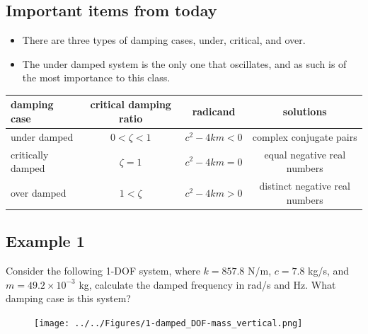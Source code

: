 \documentclass[12pt,a4paper]{article}
\begin{document}
		\subsection*{Important items from today}
	
			\begin{itemize}
				\item There are three types of damping cases, under, critical, and over. 
				\item The under damped system is the only one that oscillates, and as such is of the most importance to this class. 
			\end{itemize}

			\begin{table}[h!]
				\centering
				\begin{tabular}{lccc}
					\toprule
					damping case & critical damping ratio & radicand & solutions  \\ \midrule
					under damped &  $0<\zeta<1$ & $c^2-4km<0$ & complex conjugate pairs \\
					critically damped & $\zeta=1$ & $c^2-4km=0$ & equal negative real numbers \\
					over damped & $1<\zeta$  & $c^2-4km>0$ & distinct negative real numbers \\ \bottomrule
				\end{tabular}
			\end{table}
			
			\subsection*{Example 1}	Consider the following 1-DOF system, where $k = 857.8$ N/m, $c=7.8$ kg/s, and $m=49.2\times10^{-3}$ kg, calculate the damped frequency in rad/s and Hz. What damping case is this system?  	
			\begin{figure}[H]
				\centering
				\texttt{[image: ../../Figures/1-damped\_DOF-mass\_vertical.png]}
			\end{figure}		
\end{document}

